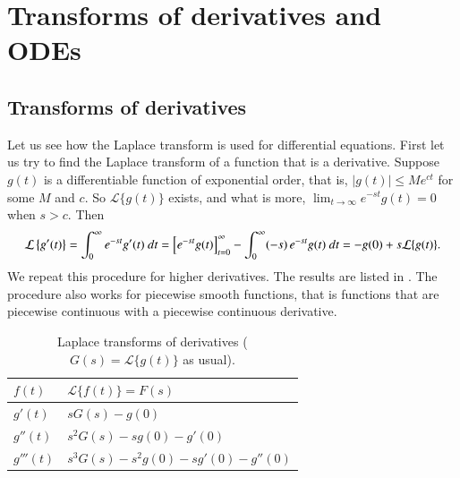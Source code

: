 \documentclass[12pt]{book}
\begin{document}

\sectionnewpage
\section{Transforms of derivatives and ODEs}


\subsection{Transforms of derivatives}

Let us see how the Laplace transform is used for differential equations.
First let us try to find the Laplace transform of a function that is a
derivative.  Suppose $g(t)$ is a differentiable function
of exponential order, that is, $\lvert g(t) \rvert \leq M e^{ct}$ for some
$M$ and $c$.  So $\mathcal{L} \{ g(t) \}$ exists, and what is more,
$\lim_{t\to\infty} e^{-st}g(t) = 0$ when $s > c$.  Then
\begin{equation*}
\mathcal{L} \left\{ g'(t) \right\}
=
\int_0^\infty
e^{-st}
g'(t) ~dt
=
\Bigl[e^{-st} g(t) \Bigr]_{t=0}^\infty
-
\int_0^\infty
(-s)\,
e^{-st}
g(t) ~dt
=
-g(0) + s \mathcal{L} \{ g(t) \} .
\end{equation*}
We repeat this procedure for higher derivatives.
The results are
listed in .  The procedure also works for piecewise
smooth functions, that is functions that are piecewise continuous with a
piecewise continuous derivative.

\begin{table}[h!t]
\capstart
\begin{center}
\begin{tabular}{@{}ll@{}}
\toprule
$f(t)$ & $\mathcal{L} \{ f(t) \} = F(s)$ \\
\midrule
$g'(t)$ & $sG(s)-g(0)$ \\[3pt]
$g''(t)$ & $s^2G(s)-sg(0)-g'(0)$ \\[3pt]
$g'''(t)$ & $s^3G(s)-s^2g(0)-sg'(0)-g''(0)$ \\
\bottomrule
\end{tabular}
\end{center}
\caption{Laplace transforms of derivatives ($G(s) = \mathcal{L} \{ g(t) \}$
as usual).\label{ltd:table}}
\end{table}
\end{document}
